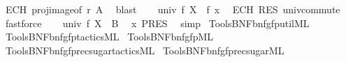 \begin{isabellebody}
\ ECH\ proj{\isacharunderscore}{\kern0pt}image{\isacharbrackleft}{\kern0pt}of\ r\ A{\isacharbrackright}{\kern0pt}\ \isamarkupfalse%
\ blast\isanewline
\ \ \isamarkupfalse%
\ {\isachardoublequoteopen}univ\ f\ X\ {\isacharequal}{\kern0pt}\ f\ x{\isachardoublequoteclose}\ \isamarkupfalse%
\ ECH\ RES\ univ{\isacharunderscore}{\kern0pt}commute\ \isamarkupfalse%
\ fastforce\isanewline
\ \ \isamarkupfalse%
\ {\isachardoublequoteopen}univ\ f\ X\ {\isasymin}\ B{\isachardoublequoteclose}\ \isamarkupfalse%
\ x\ PRES\ \isamarkupfalse%
\ simp\isanewline
{}\isamarkupfalse%
%
\endisatagproof
{\isafoldproof}%
%
\isadelimproof
\isanewline
%
\endisadelimproof
%
\isadelimML
\isanewline
%
\endisadelimML
%
\isatagML
{}\isamarkupfalse%
\ {\isacartoucheopen}Tools{\isacharslash}{\kern0pt}BNF{\isacharslash}{\kern0pt}bnf{\isacharunderscore}{\kern0pt}gfp{\isacharunderscore}{\kern0pt}util{\isachardot}{\kern0pt}ML{\isacartoucheclose}\isanewline
{}\isamarkupfalse%
\ {\isacartoucheopen}Tools{\isacharslash}{\kern0pt}BNF{\isacharslash}{\kern0pt}bnf{\isacharunderscore}{\kern0pt}gfp{\isacharunderscore}{\kern0pt}tactics{\isachardot}{\kern0pt}ML{\isacartoucheclose}\isanewline
{}\isamarkupfalse%
\ {\isacartoucheopen}Tools{\isacharslash}{\kern0pt}BNF{\isacharslash}{\kern0pt}bnf{\isacharunderscore}{\kern0pt}gfp{\isachardot}{\kern0pt}ML{\isacartoucheclose}\isanewline
{}\isamarkupfalse%
\ {\isacartoucheopen}Tools{\isacharslash}{\kern0pt}BNF{\isacharslash}{\kern0pt}bnf{\isacharunderscore}{\kern0pt}gfp{\isacharunderscore}{\kern0pt}rec{\isacharunderscore}{\kern0pt}sugar{\isacharunderscore}{\kern0pt}tactics{\isachardot}{\kern0pt}ML{\isacartoucheclose}\isanewline
{}\isamarkupfalse%
\ {\isacartoucheopen}Tools{\isacharslash}{\kern0pt}BNF{\isacharslash}{\kern0pt}bnf{\isacharunderscore}{\kern0pt}gfp{\isacharunderscore}{\kern0pt}rec{\isacharunderscore}{\kern0pt}sugar{\isachardot}{\kern0pt}ML{\isacartoucheclose}%
\endisatagML
{\isafoldML}%
%
\isadelimML
\isanewline
%
\endisadelimML
%
\isadelimtheory
\isanewline
%
\endisadelimtheory
%
\isatagtheory
{}\isamarkupfalse%
%
\endisatagtheory
{\isafoldtheory}%
%
\isadelimtheory
%
\endisadelimtheory
%
\end{isabellebody}%
\endinput
